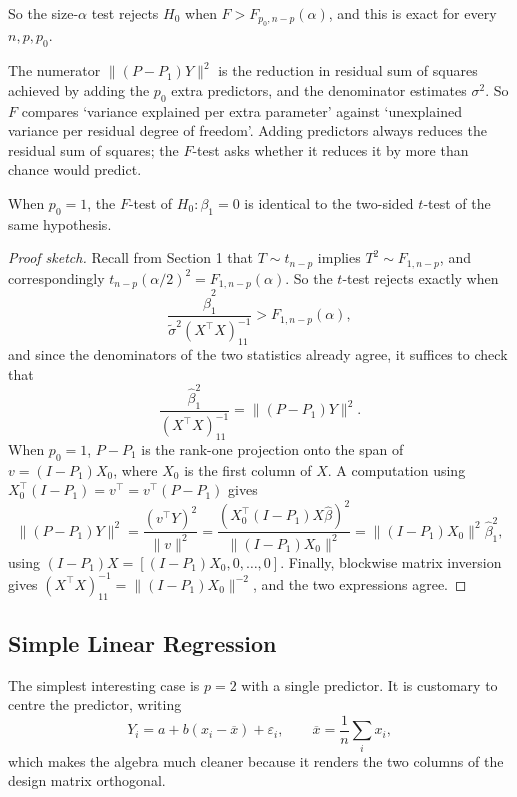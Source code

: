 \documentclass[a4paper]{scrartcl}
\begin{document}
So the size-$\alpha$ test rejects $H_0$ when $F > F_{p_0,n-p}(\alpha)$, and this is exact for every $n, p, p_0$.

\begin{remark}
  The numerator $\|(P-P_1)Y\|^2$ is the reduction in residual sum of squares achieved by adding the $p_0$ extra predictors, and the denominator estimates $\sigma^2$. So $F$ compares `variance explained per extra parameter' against `unexplained variance per residual degree of freedom'. Adding predictors always reduces the residual sum of squares; the $F$-test asks whether it reduces it by more than chance would predict.
\end{remark}

\begin{proposition}
  When $p_0 = 1$, the $F$-test of $H_0 : \beta_1 = 0$ is identical to the two-sided $t$-test of the same hypothesis.
\end{proposition}
\begin{proof}[Proof sketch]
  Recall from Section 1 that $T\sim t_{n-p}$ implies $T^2\sim F_{1,n-p}$, and correspondingly $t_{n-p}(\alpha/2)^2 = F_{1,n-p}(\alpha)$. So the $t$-test rejects exactly when
  $$
  \frac{\hat\beta_1^2}{\tilde\sigma^2(X^\top X)^{-1}_{11}} > F_{1,n-p}(\alpha),
  $$
  and since the denominators of the two statistics already agree, it suffices to check that
  $$
  \frac{\hat\beta_1^2}{(X^\top X)^{-1}_{11}} = \|(P-P_1)Y\|^2.
  $$
  When $p_0 = 1$, $P - P_1$ is the rank-one projection onto the span of $v = (I-P_1)X_0$, where $X_0$ is the first column of $X$. A computation using $X_0^\top(I-P_1) = v^\top = v^\top(P - P_1)$ gives
  $$
  \|(P-P_1)Y\|^2 = \frac{(v^\top Y)^2}{\|v\|^2} = \frac{\left(X_0^\top(I-P_1)X\hat\beta\right)^2}{\|(I-P_1)X_0\|^2} = \|(I-P_1)X_0\|^2\hat\beta_1^2,
  $$
  using $(I-P_1)X = \left[(I-P_1)X_0, 0,\dots,0\right]$. Finally, blockwise matrix inversion gives $(X^\top X)^{-1}_{11} = \|(I-P_1)X_0\|^{-2}$, and the two expressions agree.
\end{proof}

\subsection{Simple Linear Regression}

The simplest interesting case is $p = 2$ with a single predictor. It is customary to centre the predictor, writing
$$
Y_i = a + b\left(x_i - \overline{x}\right) + \varepsilon_i, \qquad \overline{x} = \frac1n\sum_i x_i,
$$
which makes the algebra much cleaner because it renders the two columns of the design matrix orthogonal.
\end{document}
